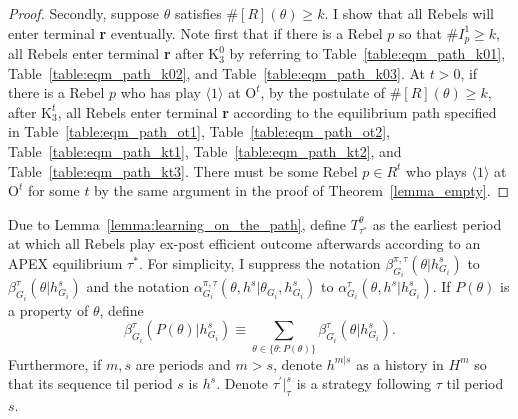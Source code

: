 \documentclass[12pt,letter]{article}
\newcommand{\Kappa}{\mathrm{K}}
\newcommand{\Omicron}{\mathrm{O}}
\theoremstyle{definition}
\theoremstyle{remark}
\theoremstyle{claim}
\begin{document}
\begin{proof}
Secondly, suppose $\theta$ satisfies $\#[R](\theta)\geq k$. I show that all Rebels will enter terminal \textbf{r} eventually. Note first that if there is a Rebel $p$ so that $\#I^1_p\geq k$, all Rebels enter terminal \textbf{r} after $\Kappa^0_3$ by referring to Table~\ref{table:eqm_path_k01}, Table~\ref{table:eqm_path_k02}, and Table~\ref{table:eqm_path_k03}. At $t>0$, if there is a Rebel $p$ who has play $\langle 1 \rangle$ at $\Omicron^t$, by the postulate of $\#[R](\theta)\geq k$, after $\Kappa^t_3$, all Rebels enter terminal \textbf{r} according to the equilibrium path specified in Table~\ref{table:eqm_path_ot1}, Table~\ref{table:eqm_path_ot2}, Table~\ref{table:eqm_path_kt1}, Table~\ref{table:eqm_path_kt2}, and Table~\ref{table:eqm_path_kt3}. There must be some Rebel $p\in R^t$ who plays $\langle 1 \rangle$ at $\Omicron^t$ for some $t$ by the same argument in the proof of Theorem~\ref{lemma_empty}.
\end{proof}


Due to Lemma~\ref{lemma:learning_on_the_path}, define $T^{\theta}_{\tau^{*}}$ as the earliest period at which all Rebels play ex-post efficient outcome afterwards according to an APEX equilibrium $\tau^{*}$.  For simplicity, I suppress the notation $\beta^{\pi,\tau}_{G_i}(\theta|h^s_{G_i})$ to $\beta^{\tau}_{G_i}(\theta|h^s_{G_i})$ and the notation $\alpha^{\pi,\tau}_{G_i}(\theta, h^{s}|\theta_{G_i},h^{s}_{G_i})$ to $\alpha^{\tau}_{G_i}(\theta, h^{s}|h^{s}_{G_i})$. If $P(\theta)$ is a property of $\theta$, define \[\beta^{\tau}_{G_i}(P(\theta)|h^s_{G_i})\equiv \sum_{\theta\in\{\theta:P(\theta)\}}\beta^{\tau}_{G_i}(\theta|h^s_{G_i}).\] Furthermore, if $m,s$ are periods and $m>s$, denote $h^{m|s}$ as a history in $H^m$ so that its sequence til period $s$ is $h^s$. Denote $\tau^{'}|^s_{\tau}$ is a strategy following $\tau$ til period $s$.
\end{document}
